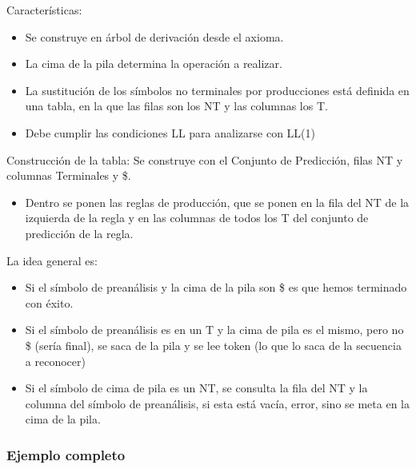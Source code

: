 \documentclass[12pt, twoside, openright]{report} %
\begin{document}
Características:

\begin{itemize}

\item
  Se construye en árbol de derivación desde el axioma.
\item
  La cima de la pila determina la operación a realizar.
\item
  La sustitución de los símbolos no terminales por producciones está
  definida en una tabla, en la que las filas son los NT y las columnas
  los T.
\item
  Debe cumplir las condiciones LL para analizarse con LL(1)
\end{itemize}

Construcción de la tabla: Se construye con el Conjunto de Predicción,
filas NT y columnas Terminales y \$.

\begin{itemize}

\item
  Dentro se ponen las reglas de producción, que se ponen en la fila del
  NT de la izquierda de la regla y en las columnas de todos los T del
  conjunto de predicción de la regla.
\end{itemize}

La idea general es:

\begin{itemize}

\item
  Si el símbolo de preanálisis y la cima de la pila son \$ es que hemos
  terminado con éxito.
\item
  Si el símbolo de preanálisis es en un T y la cima de pila es el mismo,
  pero no \$ (sería final), se saca de la pila y se lee token (lo que lo
  saca de la secuencia a reconocer)
\item
  Si el símbolo de cima de pila es un NT, se consulta la fila del NT y
  la columna del símbolo de preanálisis, si esta está vacía, error, sino
  se meta en la cima de la pila.
\end{itemize}

\pagebreak

\subsubsection{Ejemplo completo}
\end{document}
